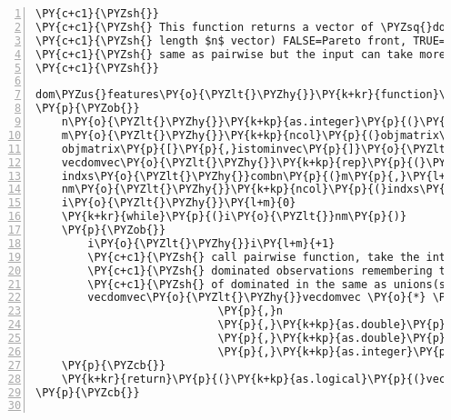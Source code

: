 \begin{Verbatim}[commandchars=\\\{\},codes={\catcode`\$=3\catcode`\^=7\catcode`\_=8},gobble=0,numbers=left,fontfamily=fvm,fontshape=n,fontsize=\footnotesize,tabsize=2]
\PY{c+c1}{\PYZsh{}}
\PY{c+c1}{\PYZsh{} This function returns a vector of \PYZsq{}dominated\PYZsq{} observations (Boolean,}
\PY{c+c1}{\PYZsh{} length $n$ vector) FALSE=Pareto front, TRUE=dominated observation}
\PY{c+c1}{\PYZsh{} same as pairwise but the input can take more than two objective functions}
\PY{c+c1}{\PYZsh{}}

dom\PYZus{}features\PY{o}{\PYZlt{}\PYZhy{}}\PY{k+kr}{function}\PY{p}{(}objmatrix\PY{p}{,}istominvec\PY{p}{)}
\PY{p}{\PYZob{}}
	n\PY{o}{\PYZlt{}\PYZhy{}}\PY{k+kp}{as.integer}\PY{p}{(}\PY{k+kp}{nrow}\PY{p}{(}objmatrix\PY{p}{)}\PY{p}{)}
	m\PY{o}{\PYZlt{}\PYZhy{}}\PY{k+kp}{ncol}\PY{p}{(}objmatrix\PY{p}{)}
	objmatrix\PY{p}{[}\PY{p}{,}istominvec\PY{p}{]}\PY{o}{\PYZlt{}\PYZhy{}} \PY{o}{\PYZhy{}}objmatrix\PY{p}{[}\PY{p}{,}istominvec\PY{p}{]}
	vecdomvec\PY{o}{\PYZlt{}\PYZhy{}}\PY{k+kp}{rep}\PY{p}{(}\PY{l+m}{1}\PY{p}{,}n\PY{p}{)}
	indxs\PY{o}{\PYZlt{}\PYZhy{}}combn\PY{p}{(}m\PY{p}{,}\PY{l+m}{2}\PY{p}{)}
	nm\PY{o}{\PYZlt{}\PYZhy{}}\PY{k+kp}{ncol}\PY{p}{(}indxs\PY{p}{)}
	i\PY{o}{\PYZlt{}\PYZhy{}}\PY{l+m}{0}
	\PY{k+kr}{while}\PY{p}{(}i\PY{o}{\PYZlt{}}nm\PY{p}{)}
	\PY{p}{\PYZob{}}
		i\PY{o}{\PYZlt{}\PYZhy{}}i\PY{l+m}{+1}
		\PY{c+c1}{\PYZsh{} call pairwise function, take the intersection of previous }
		\PY{c+c1}{\PYZsh{} dominated observations remembering the intersection(s)}
		\PY{c+c1}{\PYZsh{} of dominated in the same as unions(s) of Pareto fronts}
		vecdomvec\PY{o}{\PYZlt{}\PYZhy{}}vecdomvec \PY{o}{*} \PY{l+m}{.}C\PY{p}{(}\PY{l+s}{\PYZdq{}}\PY{l+s}{dom\PYZus{}feat\PYZdq{}}
							\PY{p}{,}n
							\PY{p}{,}\PY{k+kp}{as.double}\PY{p}{(}objmatrix\PY{p}{[}\PY{p}{,}indxs\PY{p}{[}\PY{l+m}{1}\PY{p}{,}i\PY{p}{]]}\PY{p}{)}
							\PY{p}{,}\PY{k+kp}{as.double}\PY{p}{(}objmatrix\PY{p}{[}\PY{p}{,}indxs\PY{p}{[}\PY{l+m}{2}\PY{p}{,}i\PY{p}{]]}\PY{p}{)}
							\PY{p}{,}\PY{k+kp}{as.integer}\PY{p}{(}\PY{k+kp}{rep}\PY{p}{(}\PY{l+m}{0}\PY{p}{,}n\PY{p}{)}\PY{p}{)}\PY{p}{)}\PY{p}{[[}\PY{l+m}{4}\PY{p}{]]}
	\PY{p}{\PYZcb{}}
	\PY{k+kr}{return}\PY{p}{(}\PY{k+kp}{as.logical}\PY{p}{(}vecdomvec\PY{p}{)}\PY{p}{)}
\PY{p}{\PYZcb{}}


\end{Verbatim}
